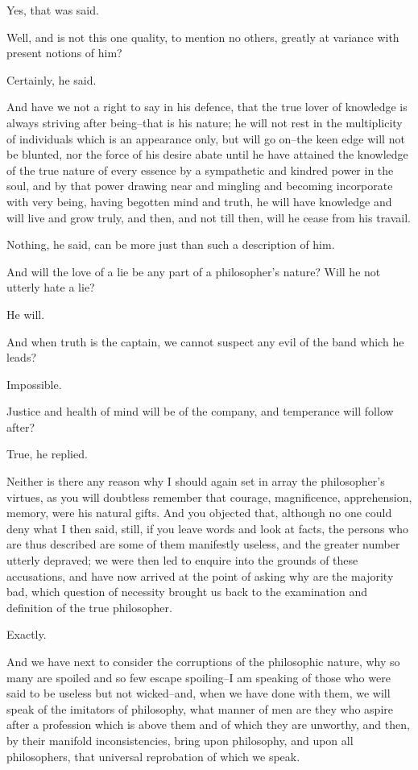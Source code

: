 Yes, that was said.

Well, and is not this one quality, to mention no others, greatly at
variance with present notions of him?

Certainly, he said.

And have we not a right to say in his defence, that the true lover of
knowledge is always striving after being--that is his nature; he will
not rest in the multiplicity of individuals which is an appearance only,
but will go on--the keen edge will not be blunted, nor the force of his
desire abate until he have attained the knowledge of the true nature
of every essence by a sympathetic and kindred power in the soul, and by
that power drawing near and mingling and becoming incorporate with very
being, having begotten mind and truth, he will have knowledge and will
live and grow truly, and then, and not till then, will he cease from his
travail.

Nothing, he said, can be more just than such a description of him.

And will the love of a lie be any part of a philosopher's nature? Will
he not utterly hate a lie?

He will.

And when truth is the captain, we cannot suspect any evil of the band
which he leads?

Impossible.

Justice and health of mind will be of the company, and temperance will
follow after?

True, he replied.

Neither is there any reason why I should again set in array the
philosopher's virtues, as you will doubtless remember that courage,
magnificence, apprehension, memory, were his natural gifts. And you
objected that, although no one could deny what I then said, still, if
you leave words and look at facts, the persons who are thus described
are some of them manifestly useless, and the greater number utterly
depraved; we were then led to enquire into the grounds of these
accusations, and have now arrived at the point of asking why are
the majority bad, which question of necessity brought us back to the
examination and definition of the true philosopher.

Exactly.

And we have next to consider the corruptions of the philosophic nature,
why so many are spoiled and so few escape spoiling--I am speaking of
those who were said to be useless but not wicked--and, when we have done
with them, we will speak of the imitators of philosophy, what manner of
men are they who aspire after a profession which is above them and of
which they are unworthy, and then, by their manifold inconsistencies,
bring upon philosophy, and upon all philosophers, that universal
reprobation of which we speak.

